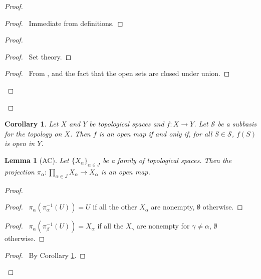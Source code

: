 \documentclass{report}
\let\qed\relax
\newtheorem{lm}{Lemma}[section]
\newtheorem{cor}{Corollary}[lm]
\theoremstyle{definition}
\begin{document}
  \begin{proof}
    \pf
    \begin{proof}
      \pf\ Immediate from definitions.
    \end{proof}
    \begin{proof}
      \begin{proof}
        \pf\ Set theory.
      \end{proof}
      \begin{proof}
        \pf\ From ,  and the fact that the open
        sets
        are closed under union.
      \end{proof}
    \end{proof}
    \qed
  \end{proof}

  \begin{cor}
    \label{cor:topology:open_map:subbasis}
    Let $X$ and $Y$ be topological spaces and $f : X \rightarrow Y$. Let
    $\mathcal{S}$ be a subbasis for the topology on $X$. Then $f$ is an open
    map
    if
    and only if, for all $S \in \mathcal{S}$, $f(S)$ is open in $Y$.
  \end{cor}

  \begin{lm}[AC]
    Let $\{X_\alpha\}_{\alpha \in J}$ be a family of topological spaces. Then
    the projection $\pi_\alpha : \prod_{\alpha \in J} X_\alpha \rightarrow
    X_\alpha$ is an open map.
  \end{lm}

  \begin{proof}
    \pf
    \begin{proof}
      \pf\ $\pi_\alpha(\pi_\alpha^{-1}(U)) = U$ if all the other $X_\alpha$ are
      nonempty, $\emptyset$ otherwise.
    \end{proof}
    \begin{proof}
      \pf\ $\pi_\alpha(\pi_\beta^{-1}(U)) = X_\alpha$ if all the $X_\gamma$ are
      nonempty for $\gamma \neq \alpha$, $\emptyset$ otherwise.
    \end{proof}
    \qedstep
    \begin{proof}
      \pf\ By Corollary \ref{cor:topology:open_map:subbasis}.
    \end{proof}
  \end{proof}
\end{document}

